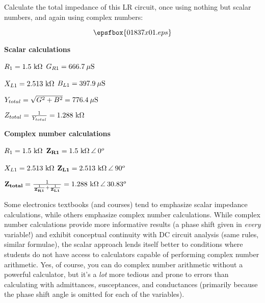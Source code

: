 

Calculate the total impedance of this LR circuit, once using nothing but scalar numbers, and again using complex numbers:

$$\epsfbox{01837x01.eps}$$







\noindent
{\bf Scalar calculations}

$R_1 = 1.5 \hbox{ k}\Omega$ \hskip 10pt $G_{R1} = 666.7 \> \mu \hbox{S}$

$X_{L1} = 2.513 \hbox{ k}\Omega$ \hskip 10pt $B_{L1} = 397.9 \> \mu \hbox{S}$

$Y_{total} = \sqrt{G^2 + B^2} = 776.4 \> \mu \hbox{S}$

$Z_{total} = {1 \over Y_{total}} = 1.288 \hbox{ k}\Omega$

\vskip 10pt

\goodbreak

\noindent
{\bf Complex number calculations}

$R_1 = 1.5 \hbox{ k}\Omega$ \hskip 10pt ${\bf Z_{R1}} = 1.5 \hbox{ k}\Omega \> \angle \> 0^o$

$X_{L1} = 2.513 \hbox{ k}\Omega$ \hskip 10pt ${\bf Z_{L1}} = 2.513 \hbox{ k}\Omega \> \angle \> 90^o$

${\bf Z_{total}} = { 1 \over {{1 \over {\bf Z_{R1}}} + {1 \over {\bf Z_{L1}}}}} = 1.288 \hbox{ k}\Omega \> \angle \> 30.83^o$







Some electronics textbooks (and courses) tend to emphasize scalar impedance calculations, while others emphasize complex number calculations.  While complex number calculations provide more informative results (a phase shift given in {\it every} variable!) and exhibit conceptual continuity with DC circuit analysis (same rules, similar formulae), the scalar approach lends itself better to conditions where students do not have access to calculators capable of performing complex number arithmetic.  Yes, of course, you can do complex number arithmetic without a powerful calculator, but it's a {\it lot} more tedious and prone to errors than calculating with admittances, susceptances, and conductances (primarily because the phase shift angle is omitted for each of the variables).




